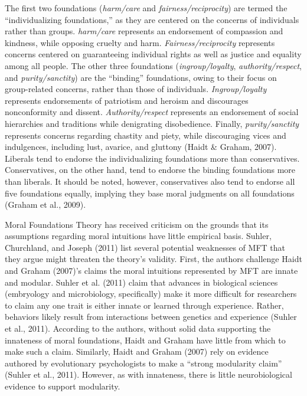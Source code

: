 \documentclass[english,,man]{apa6}
\begin{document}
The first two foundations (\emph{harm/care} and
\emph{fairness/reciprocity}) are termed the \enquote{individualizing
foundations,} as they are centered on the concerns of individuals rather
than groups. \emph{harm/care} represents an endorsement of compassion
and kindness, while opposing cruelty and harm.
\emph{Fairness/reciprocity} represents concerns centered on guaranteeing
individual rights as well as justice and equality among all people. The
other three foundations (\emph{ingroup/loyalty},
\emph{authority/respect}, and \emph{purity/sanctity}) are the
\enquote{binding} foundations, owing to their focus on group-related
concerns, rather than those of individuals. \emph{Ingroup/loyalty}
represents endorsements of patriotism and heroism and discourages
nonconformity and dissent. \emph{Authority/respect} represents an
endorsement of social hierarchies and traditions while denigrating
disobedience. Finally, \emph{purity/sanctity} represents concerns
regarding chastity and piety, while discouraging vices and indulgences,
including lust, avarice, and gluttony (Haidt \& Graham, 2007). Liberals
tend to endorse the individualizing foundations more than conservatives.
Conservatives, on the other hand, tend to endorse the binding
foundations more than liberals. It should be noted, however,
conservatives also tend to endorse all five foundations equally,
implying they base moral judgments on all foundations (Graham et al.,
2009).

Moral Foundations Theory has received criticism on the grounds that its
assumptions regarding moral intuitions have little empirical basis.
Suhler, Churchland, and Joseph (2011) list several potential weaknesses
of MFT that they argue might threaten the theory's validity. First, the
authors challenge Haidt and Graham (2007)'s claims the moral intuitions
represented by MFT are innate and modular. Suhler et al. (2011) claim
that advances in biological sciences (embryology and microbiology,
specifically) make it more difficult for researchers to claim any one
trait is either innate or learned through experience. Rather, behaviors
likely result from interactions between genetics and experience (Suhler
et al., 2011). According to the authors, without solid data supporting
the innateness of moral foundations, Haidt and Graham have little from
which to make such a claim. Similarly, Haidt and Graham (2007) rely on
evidence authored by evolutionary psychologists to make a
\enquote{strong modularity claim} (Suhler et al., 2011). However, as
with innateness, there is little neurobiological evidence to support
modularity.
\end{document}
